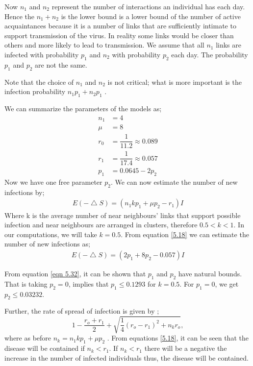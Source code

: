 Now $n_1$ and $n_2$ represent the number of interactions an individual has each day. Hence the  $n_1 + n_2$ is the lower bound is a lower bound of the number of active acquaintances because it is a number of links that are sufficiently intimate to support transmission of the virus. In reality some links would be closer than others and more likely to lead to transmission. We assume that all $n_1$ links are infected with probability $p_1$ and $n_2$ with probability $p_2$ each day. The probability $p_1$ and $p_2$ are not the same.

Note that the choice of $n_1$ and $n_2$ is not critical; what is more important is the infection probability $n_1p_1 + n_2p_1$ .

We can summarize the parameters of the models as;
\begin{align}
n_1 &= 4 \\
\mu &= 8 \\
r_0 &= \dfrac{1}{11.2} \approx 0.089 \\
r_1 &= \dfrac{1}{17.4} \approx 0.057 \\
p_1 &= 0.0645 - 2 p_2 \label{eqn 5.1.7}
\end{align}
Now we have one free parameter $p_2$. We can now estimate the number of new infections by;
\begin{align}
E(- \bigtriangleup S) = (n_1 k p_1 + \mu p_2 - r_1) I \label{5.18}
\end{align}
Where k is the average number of near neighbours' links that support possible infection and near neighbours are arranged in clusters, therefore $0.5 < k <1$.  In our computations, we will take $k = 0.5$. From equation \ref{5.18} we can estimate the number of new infections as;
\begin{align}
E(- \bigtriangleup S) = (2 p_1 + 8 p_2 - 0.057) I  \label{5.1.9}
\end{align}
 
From equation \ref{eqn 5.32}, it can be shown that $p_1$ and $p_2$ have natural bounds. That is taking $p_2 = 0$, implies that $p_1 \leq 0.1293$ for $k = 0. 5$. For $p_1 = 0$, we get $p_2 \leq 0.03232$.

Further, the rate of spread of infection is given by ;
\begin{equation}
1- \dfrac{r_o + r_1}{2} + \sqrt{\dfrac{1}{4}(r_o - r_1)^2 + n_k r_o},
\end{equation}
where as before $n_k = n_1kp_1 + \mu p_2$ \citep{fu2013propagation}. From equations \ref{5.18}, it can be seen that the disease will be contained if $n_k < r_1$. If $n_k <r_1$ there will be a negative the increase in the number of infected individuals thus, the disease will be contained. 
